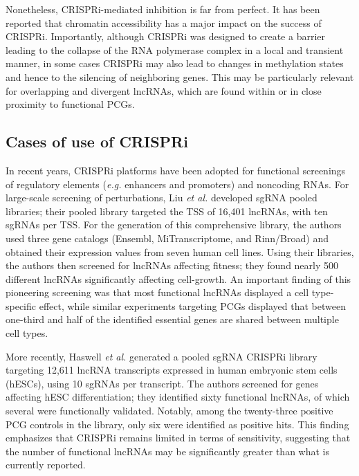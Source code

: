 Nonetheless, CRISPRi-mediated inhibition is far from perfect. It has been reported that chromatin accessibility has a major impact on the success of CRISPRi. Importantly, although CRISPRi was designed to create a barrier leading to the collapse of the RNA polymerase complex in a local and transient manner,\autocite{gilbert_2013_crispri} in some cases CRISPRi may also lead to changes in methylation states and hence to the silencing of neighboring genes.\autocite{thakore_2015_crispr} This  may be particularly relevant for overlapping and divergent lncRNAs, which are found within or in close proximity to functional PCGs.

\subsection{Cases of use of CRISPRi}
\label{subsec:crispri-useness}

In recent years, CRISPRi platforms have been adopted for functional screenings of regulatory elements (\textit{e.g.} enhancers and promoters) and noncoding RNAs.\autocite{liu_2017_crispri,liu_2020_crispri,liu_2020_crispri_glioma,Haswell_2021_crispri,cai_2020_crispri} For large-scale screening of perturbations, Liu \textit{et al.} developed sgRNA pooled libraries; their pooled library targeted the TSS of 16,401 lncRNAs, with ten sgRNAs per TSS.\autocite{liu_2017_crispri} For the generation of this comprehensive library, the authors used three gene catalogs (Ensembl, MiTranscriptome, and Rinn/Broad) and obtained their expression values from seven human cell lines. Using their libraries, the authors then screened for lncRNAs affecting fitness; they found nearly 500 different lncRNAs significantly affecting cell-growth. An important finding of this pioneering screening was that most functional lncRNAs displayed a cell type-specific effect, while similar experiments targeting PCGs displayed that between one-third and half of the identified essential genes are shared between multiple cell types.\autocite{liu_2017_crispri}

More recently, Haswell \textit{et al.} generated a pooled sgRNA CRISPRi library targeting 12,611 lncRNA transcripts expressed in human embryonic stem cells (hESCs), using 10 sgRNAs per transcript.\autocite{Haswell_2021_crispri} The authors screened for genes affecting hESC differentiation; they identified sixty functional lncRNAs, of which several were functionally validated. Notably, among the twenty-three positive PCG controls in the library, only six were identified as positive hits.\autocite{Haswell_2021_crispri} This finding emphasizes that CRISPRi remains limited in terms of sensitivity, suggesting that the number of functional lncRNAs may be significantly greater than what is currently reported. 

